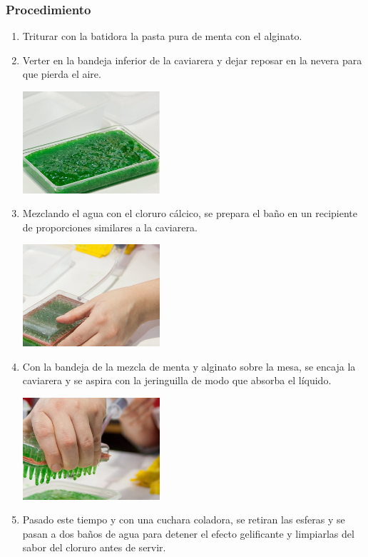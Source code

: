 \documentclass{scrartcl}
\begin{document}
	\subsubsection{Procedimiento \cite{maite}}
	\begin{multicols}{2}
		\begin{enumerate}
			\item Triturar con la batidora la pasta pura de menta con el alginato.  
			\item Verter en la bandeja inferior de la caviarera y dejar reposar en la nevera para que pierda el aire.
			\begin{center}
				\includegraphics[width = 0.4\textwidth]{images/caviar1}
			\end{center}
		
			\item Mezclando el agua con el cloruro cálcico, se prepara el baño en un recipiente de proporciones similares a la caviarera.
			\begin{center}
				\includegraphics[width = 0.4\textwidth]{images/caviar2}
			\end{center}
		
			\item Con la bandeja de la mezcla de menta y alginato sobre la mesa, se encaja la caviarera y se aspira con la jeringuilla de modo que absorba el líquido.
			\begin{center}
				\includegraphics[width = 0.4\textwidth]{images/caviar3}
			\end{center}
		
			\item Pasado este tiempo y con una cuchara coladora, se retiran las esferas y se pasan a dos baños de agua para detener el efecto gelificante y limpiarlas del sabor del cloruro antes de servir.
		\end{enumerate}
	\end{multicols}
\end{document}
